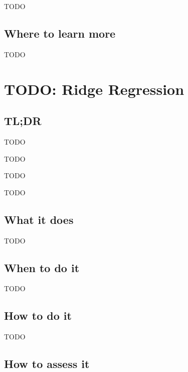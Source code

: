 \documentclass[
]{book}
\providecommand{\tightlist}{%
  \setlength{\itemsep}{0pt}\setlength{\parskip}{0pt}}
\begin{document}
TODO

\hypertarget{where-to-learn-more-11}{%
\section{Where to learn more}\label{where-to-learn-more-11}}

TODO

\hypertarget{ridge-regression}{%
\chapter{TODO: Ridge Regression}\label{ridge-regression}}

\hypertarget{tldr-12}{%
\section{TL;DR}\label{tldr-12}}

\begin{description}
\tightlist
\item[What it does]
TODO
\item[When to do it]
TODO
\item[How to do it]
TODO
\item[How to assess it]
TODO
\end{description}

\hypertarget{what-it-does-12}{%
\section{What it does}\label{what-it-does-12}}

TODO

\hypertarget{when-to-do-it-12}{%
\section{When to do it}\label{when-to-do-it-12}}

TODO

\hypertarget{how-to-do-it-12}{%
\section{How to do it}\label{how-to-do-it-12}}

TODO

\hypertarget{how-to-assess-it-12}{%
\section{How to assess it}\label{how-to-assess-it-12}}
\end{document}
